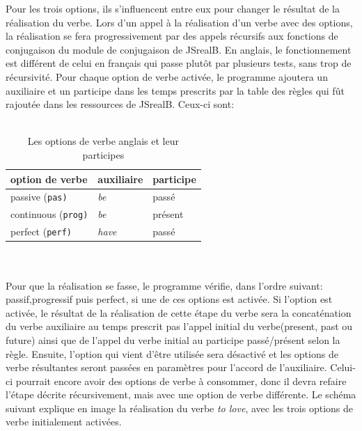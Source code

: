 \documentclass[11pt]{article} %
\newcommand{\system}[1]{\textsf{#1}}
\newcommand{\JSB}{\system{JSrealB}}
\begin{document}
Pour les trois options, ils s'influencent entre eux pour changer le
résultat de la réalisation du verbe. Lors d'un appel à la réalisation
d'un verbe avec des options, la réalisation se fera progressivement
par des appels récursifs aux fonctions de conjugaison du module de
conjugaison de \JSB{}. En anglais, le fonctionnement est différent
de celui en français qui passe plutôt par plusieurs tests, sans trop
de récursivité. Pour chaque option de verbe activée, le programme ajoutera
un auxiliaire et un participe dans les temps prescrits par la table
des règles qui fût rajoutée dans les ressources de \JSB{}. Ceux-ci
sont: 
\\
\\
\begin{table}
\caption{Les options de verbe anglais et leur participes}
\label{tab:vOptionsEng}
\begin{tabular}{|l|l|l|}
\hline 
option de verbe & auxiliaire & participe\tabularnewline
\hline 
\hline 
passive (\texttt{pas)} & \emph{be} & passé\tabularnewline
\hline 
continuous (\texttt{prog)} & \emph{be} & présent\tabularnewline
\hline 
perfect (\texttt{perf)} & \emph{have} & passé\tabularnewline
\hline 
\end{tabular}
\end{table}
\\
\\
Pour que la réalisation se fasse, le programme vérifie, dans l'ordre
suivant: passif,progressif puis perfect, si une de ces options est
activée. Si l'option est activée, le résultat de la réalisation de
cette étape du verbe sera la concaténation du verbe auxiliaire au
temps prescrit pas l'appel initial du verbe(present, past ou future)
ainsi que de l'appel du verbe initial au participe passé/présent selon
la règle. Ensuite, l'option qui vient d'être utilisée sera désactivé et les options
de verbe résultantes seront passées en paramètres pour l'accord de
l'auxiliaire. Celui-ci pourrait encore avoir des options de verbe
à consommer, donc il devra refaire l'étape décrite récursivement,
mais avec une option de verbe différente. Le schéma suivant explique
en image la réalisation du verbe \emph{to love}, avec les trois options
de verbe initialement activées.
\end{document}

